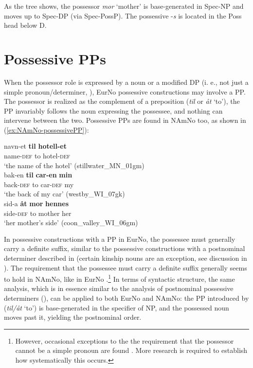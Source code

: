 \documentclass[output=paper,colorlinks,citecolor=brown]{langscibook}
\begin{document}
As the tree shows, the possessor \emph{mor} `mother' is base-generated in Spec-NP and moves up to Spec-DP (via Spec-PossP). The possessive -\emph{s} is located in the Poss head below D. 

\section{Possessive PPs}\label{sec:PP-poss}
When the possessor role is expressed by a noun or a modified DP (i. e., not just a simple pronoun/determiner, \citealt[70]{johannessenjulienlødrup2014menneskesentrert}), EurNo possessive constructions may involve a PP. The possessor is realized as the complement of a preposition (\emph{til} or \emph{åt} `to'), the PP invariably follows the noun expressing the possessee, and nothing can intervene between the two. Possessive PPs are found in NAmNo too, as shown in  (\ref{ex:NAmNo-possessivePP}):

\ea \label{ex:NAmNo-possessivePP}
\ea \gll navn-et \textbf{til} \textbf{hotell-et} \\
name-\textsc{def} to hotel-\textsc{def}\\
\glt `the name of the hotel' (stillwater\_MN\_01gm) \\
\ex \gll bak-en \textbf{til} \textbf{car-en} \textbf{min} \\
back-\textsc{def} to car-\textsc{def} my \\
\glt `the back of my car' (westby\_WI\_07gk) \\
\ex \gll sid-a \textbf{åt} \textbf{mor} \textbf{hennes} \\
side-\textsc{def} to mother her \\
\glt `her mother's side' (coon\_valley\_WI\_06gm) \\
\z
\z

\noindent In possessive constructions with a PP in EurNo, the possessee must generally carry a definite suffix, similar to the possessive constructions with a postnominal determiner described in  (certain kinship nouns are an exception, see discussion in ). 
The requirement that the possessee must carry a definite suffix generally seems to hold in NAmNo, like in EurNo \citep[203]{kinn2021split}.\footnote{However, occasional exceptions to the the requirement that the possessor cannot be a simple pronoun are found \citep[196]{kinn2021split}. More research is required to establish how systematically this occurs.} In terms of syntactic  structure, the same analysis, which is in essence similar to the analysis of postnominal possessive determiners (), can be applied to both EurNo and NAmNo: the PP introduced by (\emph{til/åt} `to') is base-generated in the specifier of NP, and the possessed noun moves past it, yielding the postnominal order. 
\end{document}
